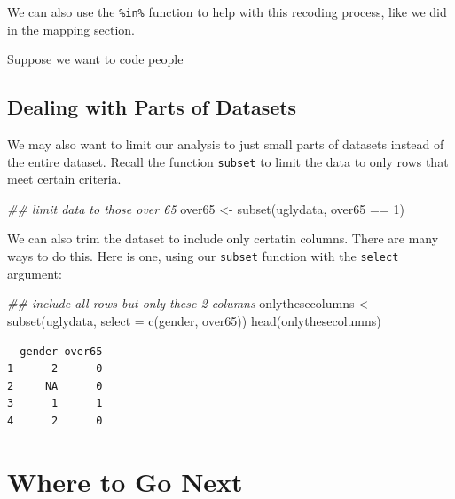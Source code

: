 \documentclass[
  letterpaper,
  DIV=11,
  numbers=noendperiod]{scrreprt}
\newenvironment{Shaded}{\begin{snugshade}}{\end{snugshade}}
\newcommand{\AttributeTok}[1]{\textcolor[rgb]{0.40,0.45,0.13}{#1}}
\newcommand{\DecValTok}[1]{\textcolor[rgb]{0.68,0.00,0.00}{#1}}
\newcommand{\DocumentationTok}[1]{\textcolor[rgb]{0.37,0.37,0.37}{\textit{#1}}}
\newcommand{\FunctionTok}[1]{\textcolor[rgb]{0.28,0.35,0.67}{#1}}
\newcommand{\NormalTok}[1]{\textcolor[rgb]{0.00,0.23,0.31}{#1}}
\newcommand{\OtherTok}[1]{\textcolor[rgb]{0.00,0.23,0.31}{#1}}
\newcommand{\SpecialCharTok}[1]{\textcolor[rgb]{0.37,0.37,0.37}{#1}}
\begin{document}
We can also use the \texttt{\%in\%} function to help with this recoding
process, like we did in the mapping section.

Suppose we want to code people

\hypertarget{dealing-with-parts-of-datasets}{%
\subsection{Dealing with Parts of
Datasets}\label{dealing-with-parts-of-datasets}}

We may also want to limit our analysis to just small parts of datasets
instead of the entire dataset. Recall the function \texttt{subset} to
limit the data to only rows that meet certain criteria.

\begin{Shaded}
\begin{Highlighting}[]
\DocumentationTok{\#\# limit data to those over 65}
\NormalTok{over65 }\OtherTok{\textless{}{-}} \FunctionTok{subset}\NormalTok{(uglydata, over65 }\SpecialCharTok{==} \DecValTok{1}\NormalTok{)}
\end{Highlighting}
\end{Shaded}

We can also trim the dataset to include only certatin columns. There are
many ways to do this. Here is one, using our \texttt{subset} function
with the \texttt{select} argument:

\begin{Shaded}
\begin{Highlighting}[]
\DocumentationTok{\#\# include all rows but only these 2 columns}
\NormalTok{onlythesecolumns }\OtherTok{\textless{}{-}} \FunctionTok{subset}\NormalTok{(uglydata, }
                           \AttributeTok{select =} \FunctionTok{c}\NormalTok{(gender,}
\NormalTok{                                      over65))}
\FunctionTok{head}\NormalTok{(onlythesecolumns)}
\end{Highlighting}
\end{Shaded}

\begin{verbatim}
  gender over65
1      2      0
2     NA      0
3      1      1
4      2      0
\end{verbatim}

\hypertarget{where-to-go-next}{%
\section{Where to Go Next}\label{where-to-go-next}}
\end{document}

